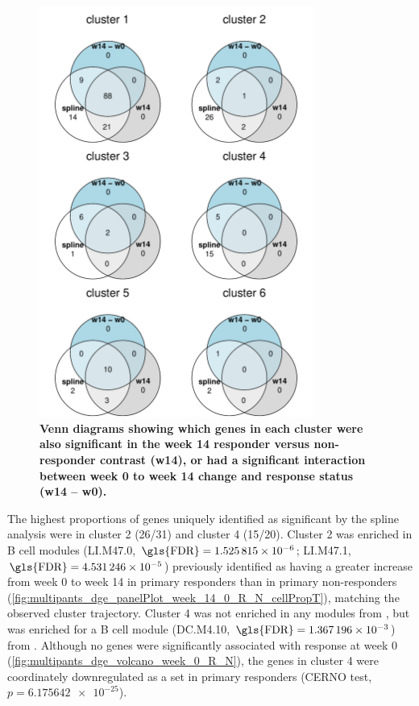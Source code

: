 \begin{figure}
    \centering
    \includegraphics[width=0.8\textwidth,page=1]{mainmatter/figures/chapter_04/plot_gene_set_enrichment.spline_cluster_venns.pdf}
    \caption{
        \textbf{Venn diagrams showing which genes in each cluster were also significant in the week 14 responder versus non-responder contrast (w14), or had a significant interaction between week 0 to week 14 change and response status (w14 -- w0).}
    }
    \label{fig:plot_gene_set_enrichment.spline_cluster_venns.pdf}
\end{figure}

The highest proportions of genes uniquely identified as significant by the spline analysis were in cluster 2 (26/31) and cluster 4 (15/20).
Cluster 2 was enriched in \textcite{li2013MolecularSignaturesAntibody} B cell modules (LI.M47.0, $\text{\gls{FDR}} = \num{1.525815e-06}$; LI.M47.1, $\text{\gls{FDR}} = \num{4.531246e-05}$)
previously identified as having a greater increase from week 0 to week 14 in primary responders than in primary non-responders (\cref{fig:multipants_dge_panelPlot_week_14_0_R_N_cellPropT}),
matching the observed cluster trajectory.
Cluster 4 was not enriched in any modules from \textcite{li2013MolecularSignaturesAntibody}, but was enriched for a B cell module (DC.M4.10, $\text{\gls{FDR}} = \num[scientific-notation = true]{0.001367196}$) from \textcite{chaussabel2008ModularAnalysisFramework}.
Although no genes were significantly associated with response at week 0 (\cref{fig:multipants_dge_volcano_week_0_R_N}),
the genes in cluster 4 were coordinately downregulated as a set in primary responders (CERNO test, $p=\num{6.175642e-25}$).

